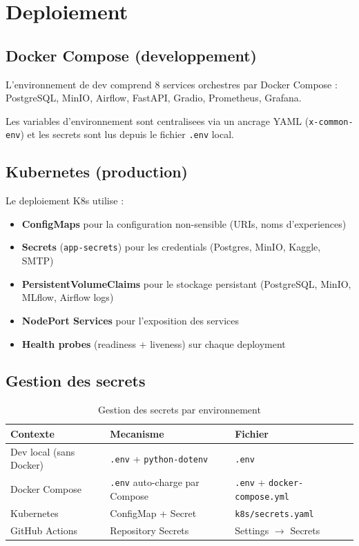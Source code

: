 \documentclass[a4paper,11pt]{article}
\begin{document}
\section{Deploiement}

\subsection{Docker Compose (developpement)}

L'environnement de dev comprend 8 services orchestres par Docker Compose :
PostgreSQL, MinIO, Airflow, FastAPI, Gradio, Prometheus, Grafana.

Les variables d'environnement sont centralisees via un ancrage YAML
(\texttt{x-common-env}) et les secrets sont lus depuis le fichier \texttt{.env} local.

\subsection{Kubernetes (production)}

Le deploiement K8s utilise :
\begin{itemize}
    \item \textbf{ConfigMaps} pour la configuration non-sensible (URIs, noms d'experiences)
    \item \textbf{Secrets} (\texttt{app-secrets}) pour les credentials (Postgres, MinIO, Kaggle, SMTP)
    \item \textbf{PersistentVolumeClaims} pour le stockage persistant (PostgreSQL, MinIO, MLflow, Airflow logs)
    \item \textbf{NodePort Services} pour l'exposition des services
    \item \textbf{Health probes} (readiness + liveness) sur chaque deployment
\end{itemize}

\subsection{Gestion des secrets}

\begin{table}[h]
\centering
\small
\begin{tabular}{lll}
\toprule
\textbf{Contexte} & \textbf{Mecanisme} & \textbf{Fichier} \\
\midrule
Dev local (sans Docker) & \texttt{.env} + \texttt{python-dotenv} & \texttt{.env} \\
Docker Compose & \texttt{.env} auto-charge par Compose & \texttt{.env} + \texttt{docker-compose.yml} \\
Kubernetes & ConfigMap + Secret & \texttt{k8s/secrets.yaml} \\
GitHub Actions & Repository Secrets & Settings $\rightarrow$ Secrets \\
\bottomrule
\end{tabular}
\caption{Gestion des secrets par environnement}
\end{table}
\end{document}
